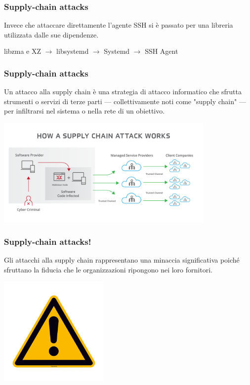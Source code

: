 \begin{frame}
\frametitle{Supply-chain attacks}
Invece che attaccare direttamente l'agente SSH si è passato per una libreria utilizzata dalle sue dipendenze.

\vspace{1 cm}
\centering
    libzma e XZ $\rightarrow$ libsystemd $\rightarrow$ Systemd $\rightarrow$ SSH Agent

\end{frame}

\begin{frame}
\frametitle{Supply-chain attacks}

Un attacco alla supply chain è una strategia di attacco informatico che sfrutta strumenti o servizi di terze parti — collettivamente noti come "supply chain" — per infiltrarsi nel sistema o nella rete di un obiettivo.

\includegraphics[width=0.8\textwidth]{img/2-Introduction/supplychain.png}
\end{frame}


\begin{frame}
\frametitle{Supply-chain attacks!}

Gli attacchi alla supply chain rappresentano una minaccia significativa poiché sfruttano la fiducia che le organizzazioni ripongono nei loro fornitori.
\begin{center}
  \includegraphics[width=0.4\textwidth]{img/2-Introduction/Warning.jpg}  
\end{center}
    
\end{frame}

